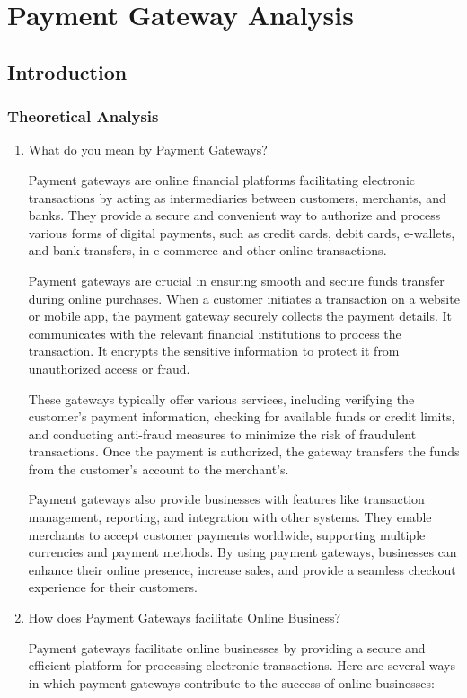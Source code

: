 \chapter{Payment Gateway Analysis}
\section{Introduction}
\subsection*{Theoretical Analysis}
\begin{enumerate}
    \item What do you mean by Payment Gateways?

Payment gateways are online financial platforms facilitating electronic transactions by acting as intermediaries between customers, merchants, and banks. They provide a secure and convenient way to authorize and process various forms of digital payments, such as credit cards, debit cards, e-wallets, and bank transfers, in e-commerce and other online transactions.

Payment gateways are crucial in ensuring smooth and secure funds transfer during online purchases. When a customer initiates a transaction on a website or mobile app, the payment gateway securely collects the payment details. It communicates with the relevant financial institutions to process the transaction. It encrypts the sensitive information to protect it from unauthorized access or fraud.

These gateways typically offer various services, including verifying the customer's payment information, checking for available funds or credit limits, and conducting anti-fraud measures to minimize the risk of fraudulent transactions. Once the payment is authorized, the gateway transfers the funds from the customer's account to the merchant's.

Payment gateways also provide businesses with features like transaction management, reporting, and integration with other systems. They enable merchants to accept customer payments worldwide, supporting multiple currencies and payment methods. By using payment gateways, businesses can enhance their online presence, increase sales, and provide a seamless checkout experience for their customers.

 \item How does Payment Gateways facilitate Online Business?

Payment gateways facilitate online businesses by providing a secure and efficient platform for processing electronic transactions. Here are several ways in which payment gateways contribute to the success of online businesses:
\begin{itemize}


\end{itemize}
\end{enumerate}
